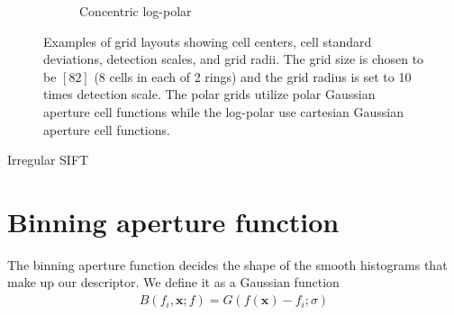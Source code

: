 \documentclass[thesis.tex]{subfiles}
\def\x{\mathbf{x}}
\begin{document}
\begin{figure}
\begin{subfigure}[t]{0.32\textwidth}
		\caption{Concentric log-polar}
		\label{fig:gridType_clp}
	\end{subfigure}
	\caption{Examples of grid layouts showing cell centers, cell standard deviations, detection scales, and grid radii. The grid size is chosen to be $[8 2]$ (8 cells in each of 2 rings) and the grid radius is set to 10 times detection scale. The polar grids utilize polar Gaussian aperture cell functions while the log-polar use cartesian Gaussian aperture cell functions.}
	\label{fig:gridType}
\end{figure}

Irregular SIFT \cite{cui2009scale}
%
\section{Binning aperture function}
%
The binning aperture function decides the shape of the smooth histograms that make up our descriptor. We define it as a Gaussian function
%
\begin{align}
B(f_i, \x; f) = G(f(\x) - f_i; \sigma)
\end{align}
%
\end{document}
